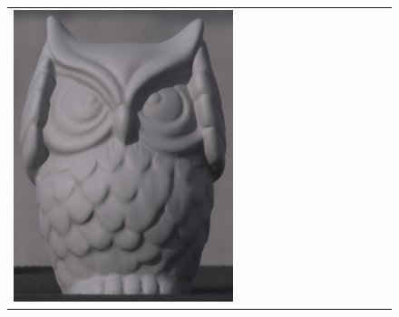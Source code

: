 \begin{figure}[!ht]
\begin{tabular}{@{}rcccccccccccc@{}}
    \includegraphics[width=\customwidth]{./figures/reconstruction/object/150215.jpg} &

\end{tabular}
\end{figure}
